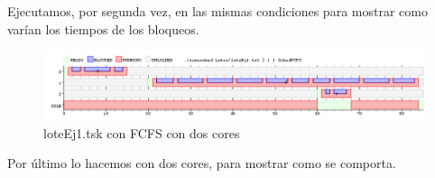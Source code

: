 Ejecutamos, por segunda vez, en las mismas condiciones para mostrar como varían los tiempos de los bloqueos.

\begin{figure}[H]
  \centering
    \includegraphics[width=1.1\textwidth]{imagenes/Ex3Ej1.png}
  \caption{loteEj1.tsk con FCFS con dos cores}
\end{figure}

Por último lo hacemos con dos cores, para mostrar como se comporta. 
